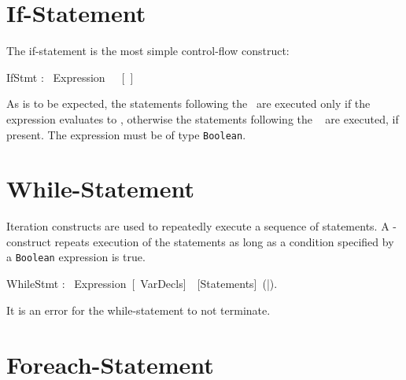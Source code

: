 
\section{If-Statement}\label{sect:IfStmt}



The if-statement is the most simple control-flow construct:


\bgr
IfStmt : \kwIf~Expression~\kwThen~~[\kwElse~]~\kwEnd
\egr



As is to be expected, the statements following the \kwThen ~are
executed only if the expression evaluates to \kwTrue, otherwise the
statements following the \kwElse~ are executed, if present. The
expression must be of type {\tt Boolean}.



\section{While-Statement}\label{sect:WhileStmt}



Iteration constructs are used to repeatedly execute a sequence of
statements. A \kwWhile-construct repeats execution of the statements
as long as a condition specified by a {\tt Boolean} expression is true.


\bgr
WhileStmt : \kwWhile~Expression~[\kwVar~VarDecls]~\kwDo~[Statements]~(\kwEnd|\kwEndWhile).
\egr

It is an error for the while-statement to not terminate.




\section{Foreach-Statement}\label{sect:ForeachStmt}

